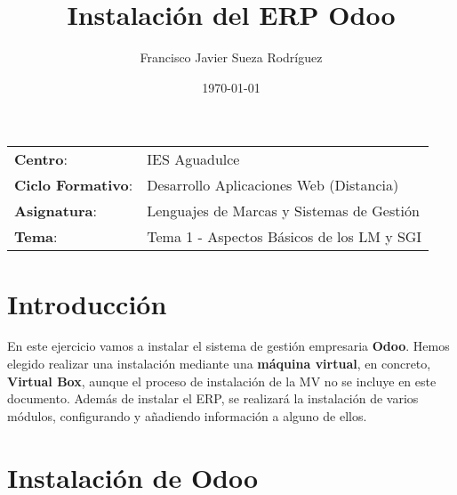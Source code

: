 


\title{
\normalfont \normalsize
\huge \textbf{Instalación del ERP Odoo}
}

\author{Francisco Javier Sueza Rodríguez}
\date{\normalsize\today}



\maketitle

\begin{center}
    \begin{tabular}{l l}
        \textbf{Centro}: & IES Aguadulce \\
        \textbf{Ciclo Formativo}: & Desarrollo Aplicaciones Web (Distancia)\\
        \textbf{Asignatura}: & Lenguajes de Marcas y Sistemas de Gestión \\
        \textbf{Tema}: & Tema 1 - Aspectos Básicos de los LM y SGI \\
    \end{tabular}
\end{center}




\vspace{10ex}

\section{Introducción}
En este ejercicio vamos a instalar el sistema de gestión empresaria \textbf{Odoo}. Hemos elegido realizar una instalación mediante una \textbf{máquina virtual}, en concreto, \textbf{Virtual Box}, aunque el proceso de instalación de la MV no se incluye en este documento. Además de instalar el ERP, se realizará la instalación de varios módulos, configurando y añadiendo información a alguno de ellos.

\section{Instalación de Odoo}



\newpage



